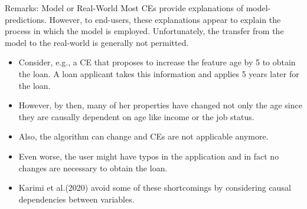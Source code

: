 \documentclass[11pt,compress,t,notes=noshow, xcolor=table]{beamer}
\begin{document}
\begin{vbframe}{Remarks: Model or Real-World}
Most CEs provide explanations of model-predictions. However, to end-users, these explanations appear to explain the process in which the model is employed. Unfortunately, the transfer from the model to the real-world is generally not permitted.
	\begin{itemize}
	\item Consider, e.g., a CE that proposes to increase the feature age by 5 to obtain the loan. A loan applicant takes this information and applies 5 years later for the loan. 
	\item However, by then, many of her properties have changed not only the age since they are causally dependent on age like income or the job status.
	\item Also, the algorithm can change and CEs are not applicable anymore.
	\item Even worse, the user might have typos in the application and in fact no changes are necessary to obtain the loan.
	\item Karimi et al.(2020) avoid some of these shortcomings by considering causal dependencies between variables.
	\end{itemize}
\end{vbframe}
\end{document}
